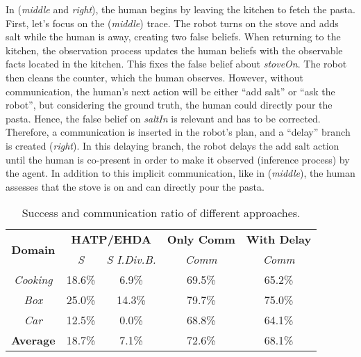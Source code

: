In (\textit{middle} and \textit{right}), the human begins by leaving the kitchen to fetch the pasta. First, let's focus on the (\textit{middle}) trace. The robot turns on the stove and adds salt while the human is away, creating two false beliefs. When returning to the kitchen, the observation process updates the human beliefs with the observable facts located in the kitchen. This fixes the false belief about \textit{stoveOn}. The robot then cleans the counter, which the human observes. 
However, without communication, the human's next action will be either ``add salt'' or ``ask the robot'', but considering the ground truth, the human could directly pour the pasta. Hence, the false belief on \textit{saltIn} is relevant and has to be corrected. Therefore, a communication is inserted in the robot's plan, and a ``delay'' branch is created (\textit{right}). 
In this delaying branch, the robot delays the add salt action until the human is co-present in order to make it observed (inference process) by the agent. 
In addition to this implicit communication, like in (\textit{middle}), the human assesses that the stove is on and can directly pour the pasta. 
\begin{table}[t]
    \centering
    \vspace{0.1cm}
    \caption
    {
    Success and communication ratio of different approaches. 
    }
    \label{tab:q_results}
    \begin{tabular}{@{}c|c c|| c| c@{}}
        \multirow{2}{*}{\textbf{Domain}} & \multicolumn{2}{c||}{\textbf{HATP/EHDA}} & \multicolumn{1}{c|}{\textbf{Only Comm}} & \multicolumn{1}{c}{\textbf{With Delay}}
        \\
        & \multicolumn{1}{c}{\textit{S}} & \multicolumn{1}{c||}{\textit{S I.Div.B.}} & \multicolumn{1}{c|}{\textit{Comm}} & \multicolumn{1}{c}{\textit{Comm}} 
        \\ \cline{1-5}
        \textit{Cooking}    &   18.6\%  &  6.9\%    & 69.5\% & 65.2\%\\
        \textit{Box}        &   25.0\%  & 14.3\%    & 79.7\% & 75.0\%\\
        \textit{Car}        &   12.5\%  & 0.0\%     & 68.8\% & 64.1\%\\
        \hline
        \textbf{Average}    &   18.7\%  & 7.1\%     & 72.6\% & 68.1\%\\
    \end{tabular}
\end{table}

